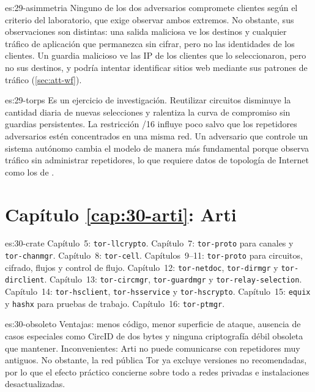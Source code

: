 \begin{soluzione}{es:29-asimmetria}
Ninguno de los dos adversarios compromete clientes según el criterio del laboratorio, que exige observar ambos extremos. No obstante, sus observaciones son distintas: una salida maliciosa ve los destinos y cualquier tráfico de aplicación que permanezca sin cifrar, pero no las identidades de los clientes. Un guardia malicioso ve las IP de los clientes que lo seleccionaron, pero no sus destinos, y podría intentar identificar sitios web mediante sus patrones de tráfico (\cref{sec:att-wf}).
\end{soluzione}

\begin{soluzione}{es:29-torps}
Es un ejercicio de investigación. Reutilizar circuitos disminuye la cantidad diaria de nuevas selecciones y ralentiza la curva de compromiso sin guardias persistentes. La restricción /16 influye poco salvo que los repetidores adversarios estén concentrados en una misma red. Un adversario que controle un sistema autónomo cambia el modelo de manera más fundamental porque observa tráfico sin administrar repetidores, lo que requiere datos de topología de Internet como los de \cite{johnson2013users}.
\end{soluzione}

\section*{Capítulo \ref{cap:30-arti}: Arti}

\begin{soluzione}{es:30-crate}
Capítulo~5: \texttt{tor-llcrypto}. Capítulo~7: \texttt{tor-proto} para canales y \texttt{tor-chanmgr}. Capítulo~8: \texttt{tor-cell}. Capítulos~9--11: \texttt{tor-proto} para circuitos, cifrado, flujos y control de flujo. Capítulo~12: \texttt{tor-netdoc}, \texttt{tor-dirmgr} y \texttt{tor-dirclient}. Capítulo~13: \texttt{tor-circmgr}, \texttt{tor-guardmgr} y \texttt{tor-relay-selection}. Capítulo~14: \texttt{tor-hsclient}, \texttt{tor-hsservice} y \texttt{tor-hscrypto}. Capítulo~15: \texttt{equix} y \texttt{hashx} para pruebas de trabajo. Capítulo~16: \texttt{tor-ptmgr}.
\end{soluzione}

\begin{soluzione}{es:30-obsoleto}
Ventajas: menos código, menor superficie de ataque, ausencia de casos especiales como CircID de dos bytes y ninguna criptografía débil obsoleta que mantener. Inconvenientes: Arti no puede comunicarse con repetidores muy antiguos. No obstante, la red pública Tor ya excluye versiones no recomendadas, por lo que el efecto práctico concierne sobre todo a redes privadas e instalaciones desactualizadas.
\end{soluzione}


